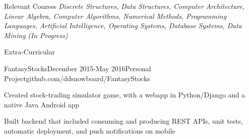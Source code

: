 \documentclass{resume} %
\begin{document}
    \begin{rSection}{Relevant Courses}
        \textit{Discrete Structures, Data Structures, Computer Architecture, Linear Algebra, Computer Algorithms, Numerical Methods, Programming Languages, Artificial Intelligence, Operating Systems, Database Systems, Data Mining (In Progress)}

    \end{rSection}


    \begin{rSection}{Extra-Curricular} \itemsep -3pt
        \begin{rSubsection}{FantasyStocks}{December 2015-May 2016}{Personal Project}{github.com/ddsnowboard/FantasyStocks}
        \item Created stock-trading simulator game, with a webapp in Python/Django and a native Java Android app
        \item Built backend that included consuming and producing REST APIs, unit tests, automatic deployment, and push notifications on mobile
        \end{rSubsection}

    \end{rSection}

    
\end{document}
